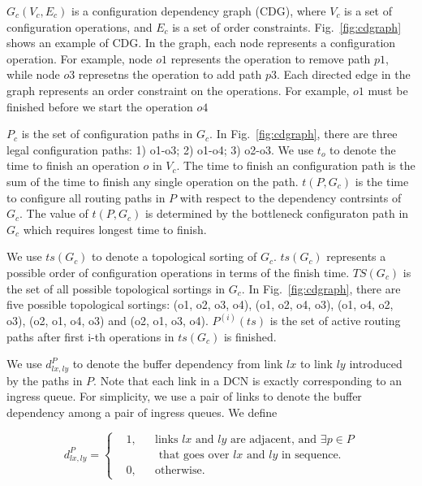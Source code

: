 

$G_c(V_c,E_c)$ is a configuration dependency graph (CDG), where $V_c$ is a set of configuration operations, and $E_c$ is a set of order constraints. Fig.~\ref{fig:cdgraph} shows an example of CDG. In the graph, each node represents a configuration operation. For example, node $o1$ represents the operation to remove path $p1$, while node $o3$ represetns the operation to add path $p3$. Each directed edge in the graph represents an order constraint on the operations. For example,  $o1$ must be finished before we start the operation $o4$

$P_c$ is the set of configuration paths in $G_c$. In Fig.~\ref{fig:cdgraph}, there are three legal configuration paths: 1) o1-o3; 2) o1-o4; 3) o2-o3. 
We use $t_o$ to denote the time to finish an operation $o$ in  $V_c$.  The time to finish an configuration path is the sum of the time to finish any single operation on the path. $t(P, G_c)$ is the time to configure all routing paths in $P$ with respect to the dependency contrsints of $G_c$. The value of $t(P, G_c)$ is determined by the bottleneck configuraton path in $G_c$ which requires longest time to finish.

We use $ts(G_c)$ to denote a topological sorting of $G_c$. $ts(G_c)$ represents a possible order of configuration operations in terms of the finish time.  $TS(G_c)$ is the set of all possible topological sortings in $G_c$. In Fig.~\ref{fig:cdgraph}, there are five possible topological sortings: (o1, o2, o3, o4), (o1, o2, o4, o3), (o1, o4, o2, o3), (o2, o1, o4, o3) and (o2, o1, o3, o4). $P^{(i)}(ts)$ is  the set of active routing paths after first i-th operations in $ts(G_c)$ is finished. 

We use $d_{lx,ly}^P$ to denote the buffer dependency from link $lx$ to link $ly$ introduced by the paths in $P$. Note that each link in a DCN is exactly corresponding to an ingress queue. For simplicity, we use a pair of links to denote the buffer dependency among a pair of ingress queues.  We define

\begin{equation} \label{eq:1}
d_{lx,ly}^P = \left \{
\begin{aligned}
&1, && \text{links } lx \text{ and } ly\text{ are adjacent, and } \exists p \in P\\
&    &&  \text{ that goes over } lx \text{ and } ly\text{ in sequence.}\\ 
&0, && \text{otherwise.}
\end{aligned} \right.
\end{equation} 


